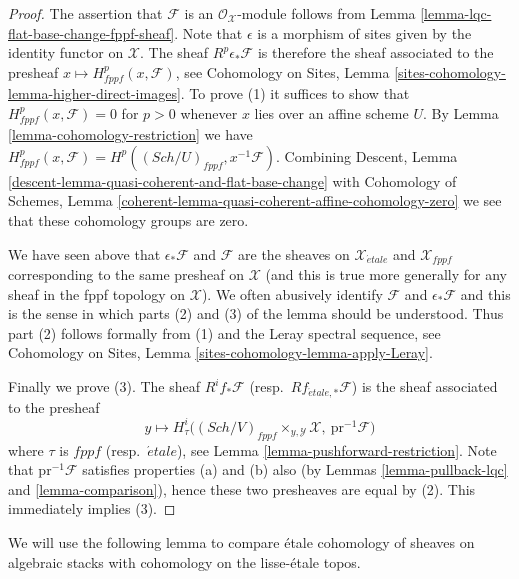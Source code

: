 \documentclass{stacks-project}
\theoremstyle{plain}
\theoremstyle{definition}
\theoremstyle{remark}
\numberwithin{equation}{subsection}
\def\Sch{\mathit{Sch}}
\def\etale{{\acute{e}tale}}
\begin{document}
\begin{proof}
The assertion that $\mathcal{F}$ is an $\mathcal{O}_\mathcal{X}$-module
follows from
Lemma \ref{lemma-lqc-flat-base-change-fppf-sheaf}.
Note that $\epsilon$ is a morphism of sites given by the identity
functor on $\mathcal{X}$. The sheaf $R^p\epsilon_*\mathcal{F}$ is therefore
the sheaf associated to the presheaf
$x \mapsto H^p_{fppf}(x, \mathcal{F})$, see
Cohomology on Sites, Lemma \ref{sites-cohomology-lemma-higher-direct-images}.
To prove (1) it suffices to show that
$H^p_{fppf}(x, \mathcal{F}) = 0$ for $p > 0$
whenever $x$ lies over an affine scheme $U$. By
Lemma \ref{lemma-cohomology-restriction}
we have
$H^p_{fppf}(x, \mathcal{F}) = H^p((\Sch/U)_{fppf}, x^{-1}\mathcal{F})$.
Combining
Descent, Lemma \ref{descent-lemma-quasi-coherent-and-flat-base-change}
with Cohomology of Schemes, Lemma
\ref{coherent-lemma-quasi-coherent-affine-cohomology-zero}
we see that these cohomology groups are zero.

\medskip\noindent
We have seen above that $\epsilon_*\mathcal{F}$ and $\mathcal{F}$ are the
sheaves on $\mathcal{X}_\etale$ and $\mathcal{X}_{fppf}$
corresponding to the same presheaf on $\mathcal{X}$ (and this is true more
generally for any sheaf in the fppf topology on $\mathcal{X}$).
We often abusively identify $\mathcal{F}$ and $\epsilon_*\mathcal{F}$
and this is the sense in which parts (2) and (3) of the lemma should be
understood. Thus part (2) follows formally from (1) and the Leray spectral
sequence, see
Cohomology on Sites, Lemma \ref{sites-cohomology-lemma-apply-Leray}.

\medskip\noindent
Finally we prove (3). The sheaf $R^if_*\mathcal{F}$
(resp.\ $Rf_{\etale, *}\mathcal{F}$)
is the sheaf associated to the presheaf
$$
y \longmapsto
H^i_\tau\Big((\Sch/V)_{fppf} \times_{y, \mathcal{Y}} \mathcal{X},
\ \text{pr}^{-1}\mathcal{F}\Big)
$$
where $\tau$ is $fppf$ (resp.\ $\etale$), see
Lemma \ref{lemma-pushforward-restriction}.
Note that $\text{pr}^{-1}\mathcal{F}$ satisfies properties (a) and (b)
also (by Lemmas \ref{lemma-pullback-lqc} and \ref{lemma-comparison}),
hence these two presheaves are equal by (2).
This immediately implies (3).
\end{proof}

\noindent
We will use the following lemma to compare \'etale cohomology of sheaves
on algebraic stacks with cohomology on the lisse-\'etale topos.
\end{document}
